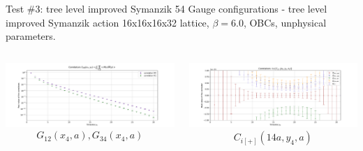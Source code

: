 \documentclass{beamer}
\begin{document}
\begin{frame}{Test \#3: tree level improved Symanzik}
      54 Gauge configurations - tree level improved Symanzik action\newline
      16x16x16x32 lattice, $\beta = 6.0$, OBCs, unphysical parameters.
      \begin{columns}
            \begin{column}{.5\textwidth}
                  \includegraphics[width=\textwidth]{../thesis-tex/imgs-MSc-thesis/pureYM-2pts.pdf}
                  $$G_{12}(x_4,a), G_{34}(x_4,a)$$
            \end{column}
            \begin{column}{.5\textwidth}
                  \includegraphics[width=\textwidth]{../thesis-tex/imgs-MSc-thesis/pureYM-3pts.pdf}
                  $$C_{i[+]}(14a,y_4,a)$$
            \end{column}
      \end{columns}
\end{frame}
\end{document}
